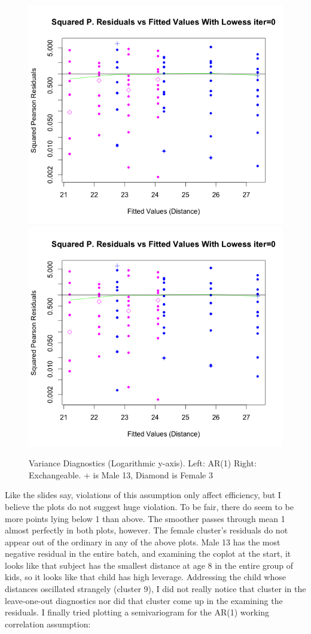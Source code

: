\documentclass[11pt]{article}
\begin{document}
\begin{enumerate}
\begin{figure}[H]
			\includegraphics[scale=0.4]{RplotAR1Var.png}	
			\includegraphics[scale=0.4]{RplotExchVar.png}
			\caption{Variance Diagnostics (Logarithmic y-axis). Left: AR(1) Right: Exchangeable. + is Male 13, Diamond is Female 3}
		\end{figure}
		Like the slides say, violations of this assumption only affect efficiency, but I believe the plots do not suggest huge violation. To be fair, there do seem to be more points lying below 1 than above. The smoother passes through mean 1 almost perfectly in both plots, however. The female cluster's residuals do not appear out of the ordinary in any of the above plots. Male 13 has the most negative residual in the entire batch, and examining the coplot at the start, it looks like that subject has the smallest distance at age 8 in the entire group of kids, so it looks like that child has high leverage. Addressing the child whose distances oscillated strangely (cluster 9), I did not really notice that cluster in the leave-one-out diagnostics nor did that cluster come up in the examining the residuals. I finally tried plotting a semivariogram for the AR(1) working correlation assumption:

\end{enumerate}
\end{document}
